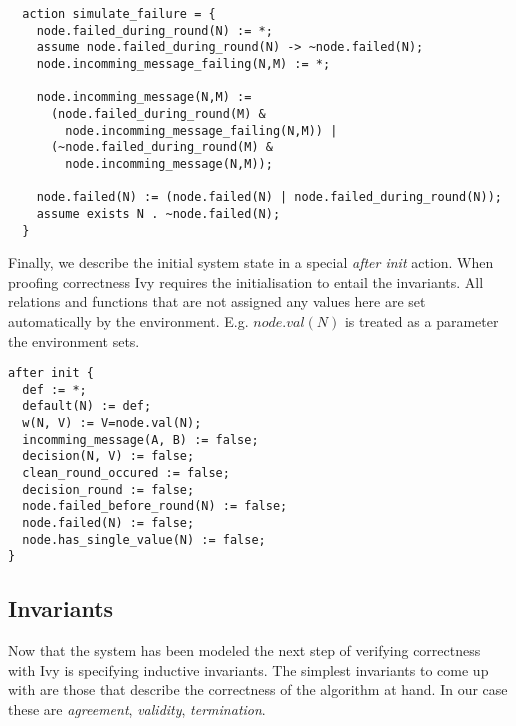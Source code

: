 \documentclass[fleqn]{article}
\begin{document}
\begin{mdframed}[backgroundcolor=light-gray, roundcorner=10pt,leftmargin=1, rightmargin=1, innerleftmargin=5, innertopmargin=15,innerbottommargin=15, outerlinewidth=1, linecolor=light-gray]
\begin{lstlisting}
  action simulate_failure = {
    node.failed_during_round(N) := *;
    assume node.failed_during_round(N) -> ~node.failed(N);
    node.incomming_message_failing(N,M) := *;

    node.incomming_message(N,M) :=
      (node.failed_during_round(M) &
        node.incomming_message_failing(N,M)) |
      (~node.failed_during_round(M) &
        node.incomming_message(N,M));

    node.failed(N) := (node.failed(N) | node.failed_during_round(N));
    assume exists N . ~node.failed(N);
  }
\end{lstlisting}
\end{mdframed}

Finally, we describe the initial system state in a special \textit{after init} action. When
proofing correctness Ivy requires the initialisation to entail the invariants. All relations and functions
that are not assigned any values here are set automatically by the environment. E.g. $node.val(N)$ is
treated as a parameter the environment sets.

\begin{mdframed}[backgroundcolor=light-gray, roundcorner=10pt,leftmargin=1, rightmargin=1, innerleftmargin=5, innertopmargin=15,innerbottommargin=15, outerlinewidth=1, linecolor=light-gray]
\begin{lstlisting}
after init {
  def := *;
  default(N) := def;
  w(N, V) := V=node.val(N);
  incomming_message(A, B) := false;
  decision(N, V) := false;
  clean_round_occured := false;
  decision_round := false;
  node.failed_before_round(N) := false;
  node.failed(N) := false;
  node.has_single_value(N) := false;
}
\end{lstlisting}
\end{mdframed}

\subsection{Invariants}

Now that the system has been modeled the next step of verifying correctness with Ivy is specifying inductive invariants. The simplest invariants to come up with are those that describe the correctness of the algorithm at hand. In our case these are \textit{agreement}, \textit{validity}, \textit{termination}.
\end{document}
